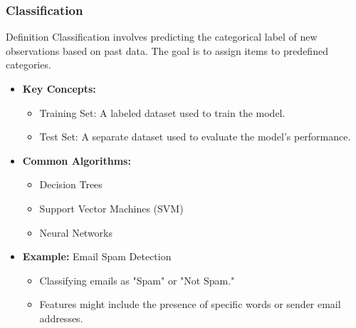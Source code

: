 \documentclass[aspectratio=169]{beamer}
\begin{document}
\begin{frame}[fragile]
    \frametitle{Classification}
    \begin{block}{Definition}
        Classification involves predicting the categorical label of new observations based on past data. The goal is to assign items to predefined categories.
    \end{block}

    \begin{itemize}
        \item \textbf{Key Concepts:}
            \begin{itemize}
                \item Training Set: A labeled dataset used to train the model.
                \item Test Set: A separate dataset used to evaluate the model's performance.
            \end{itemize}
        \item \textbf{Common Algorithms:}
            \begin{itemize}
                \item Decision Trees
                \item Support Vector Machines (SVM)
                \item Neural Networks
            \end{itemize}
        \item \textbf{Example:} Email Spam Detection
            \begin{itemize}
                \item Classifying emails as "Spam" or "Not Spam." 
                \item Features might include the presence of specific words or sender email addresses.
            \end{itemize}
    \end{itemize}
\end{frame}
\end{document}
